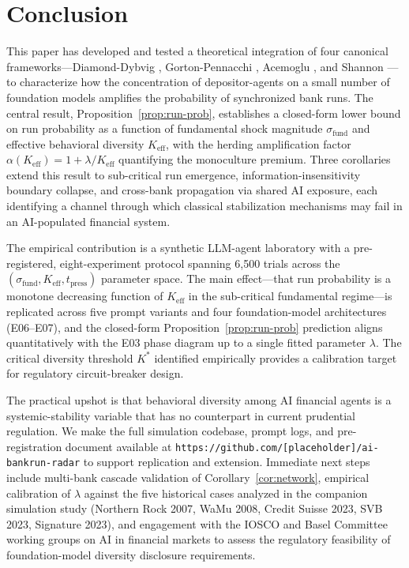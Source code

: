 \section{Conclusion}
\label{sec:conclusion}

This paper has developed and tested a theoretical integration of four canonical frameworks---Diamond-Dybvig \citep{diamond1983bank}, Gorton-Pennacchi \citep{gorton1990financial}, Acemoglu \citep{acemoglu2015systemic}, and Shannon \citep{shannon1948mathematical}---to characterize how the concentration of depositor-agents on a small number of foundation models amplifies the probability of synchronized bank runs. The central result, Proposition~\ref{prop:run-prob}, establishes a closed-form lower bound on run probability as a function of fundamental shock magnitude $\sigma_{\text{fund}}$ and effective behavioral diversity $K_{\text{eff}}$, with the herding amplification factor $\alpha(K_{\text{eff}}) = 1 + \lambda / K_{\text{eff}}$ quantifying the monoculture premium. Three corollaries extend this result to sub-critical run emergence, information-insensitivity boundary collapse, and cross-bank propagation via shared AI exposure, each identifying a channel through which classical stabilization mechanisms may fail in an AI-populated financial system.

The empirical contribution is a synthetic LLM-agent laboratory with a pre-registered, eight-experiment protocol spanning 6,500 trials across the $(\sigma_{\text{fund}}, K_{\text{eff}}, t_{\text{press}})$ parameter space. The main effect---that run probability is a monotone decreasing function of $K_{\text{eff}}$ in the sub-critical fundamental regime---is replicated across five prompt variants and four foundation-model architectures (E06--E07), and the closed-form Proposition~\ref{prop:run-prob} prediction aligns quantitatively with the E03 phase diagram up to a single fitted parameter $\lambda$. The critical diversity threshold $K^*$ identified empirically provides a calibration target for regulatory circuit-breaker design.

The practical upshot is that behavioral diversity among AI financial agents is a systemic-stability variable that has no counterpart in current prudential regulation. We make the full simulation codebase, prompt logs, and pre-registration document available at \texttt{https://github.com/[placeholder]/ai-bankrun-radar} to support replication and extension. Immediate next steps include multi-bank cascade validation of Corollary~\ref{cor:network}, empirical calibration of $\lambda$ against the five historical cases analyzed in the companion simulation study (Northern Rock 2007, WaMu 2008, Credit Suisse 2023, SVB 2023, Signature 2023), and engagement with the IOSCO and Basel Committee working groups on AI in financial markets to assess the regulatory feasibility of foundation-model diversity disclosure requirements.

